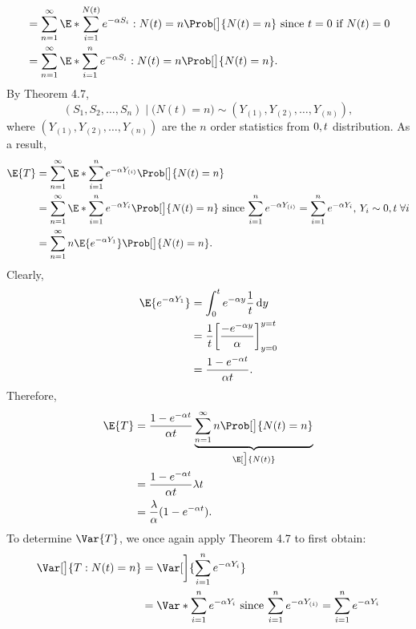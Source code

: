 \begin{Example}
\begin{align*}
         & =\sum_{n=1}^{\infty}\E*{\sum_{i=1}^{N(t)}e^{-\alpha S_i}\given N(t)=n}\Prob[\big]{N(t)=n} \text{ since $t=0$ if $N(t)=0$} \\
         & =\sum_{n=1}^{\infty}\E*{\sum_{i=1}^{n}e^{-\alpha S_i}\given N(t)=n}\Prob[\big]{N(t)=n}.
    \end{align*}
    By Theorem 4.7,
    \[ (S_1,S_2,\ldots,S_n)\mid\bigl(N(t)=n\bigr) \sim (Y_{(1)},Y_{(2)},\ldots,Y_{(n)}), \]
    where $ (Y_{(1)},Y_{(2)},\ldots,Y_{(n)}) $ are the $ n $ order statistics from
    $ \relax{0,t} $ distribution. As a result,
    \begin{align*}
        \E{T}
         & =\sum_{n=1}^{\infty}\E*{\sum_{i=1}^{n}e^{-\alpha Y_{(i)}}}\Prob[\big]{N(t)=n}                                                                                                                   \\
         & =\sum_{n=1}^{\infty}\E*{\sum_{i=1}^{n}e^{-\alpha Y_{i}}}\Prob[\big]{N(t)=n}\text{ since $ \sum_{i=1}^{n}e^{-\alpha Y_{(i)}}=\sum_{i=1}^{n}e^{-\alpha Y_{i}} $, $ Y_i \sim \U{0,t}\;\forall i $} \\
         & =\sum_{n=1}^{\infty}n\E{e^{-\alpha Y_1}}\Prob[\big]{N(t)=n}.
    \end{align*}
    Clearly,
    \begin{align*}
        \E{e^{-\alpha Y_1}}
         & =\int_{0}^{t}e^{-\alpha y}\frac{1}{t}\odif{y}                       \\
         & =\frac{1}{t}\biggl[\frac{-e^{-\alpha y}}{\alpha}\biggr]_{y=0}^{y=t} \\
         & =\frac{1-e^{-\alpha t}}{\alpha t}.
    \end{align*}
    Therefore,
    \begin{align*}
        \E{T}
         & =\frac{1-e^{-\alpha t}}{\alpha t}\underbrace{\sum_{n=1}^{\infty} n\Prob[\big]{N(t)=n}}_{\E[\big]{N(t)}} \\
         & =\frac{1-e^{-\alpha t}}{\alpha t}\lambda t                                                              \\
         & =\frac{\lambda}{\alpha}(1-e^{-\alpha t}).
    \end{align*}
    To determine $ \Var{T} $, we once again apply Theorem 4.7 to first obtain:
    \begin{align*}
        \Var[\big]{T\given N(t)=n}
         & =\Var[\bigg]{\sum_{i=1}^{n}e^{-\alpha Y_{i}}}                                                                            \\
         & =\Var*{\sum_{i=1}^{n}e^{-\alpha Y_i}}\text{ since $ \sum_{i=1}^{n}e^{-\alpha Y_{(i)}}=\sum_{i=1}^{n}e^{-\alpha Y_{i}} $} \\

\end{align*}
\end{Example}
